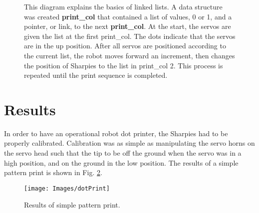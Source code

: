 \documentclass[11pt, oneside]{article}
\begin{document}
\begin{figure}[H]
    \centering
    \caption{This diagram explains the basics of linked lists. A data structure was created \textbf{print\_col} that contained a list of values, 0 or 1, and a pointer, or link, to the next \textbf{print\_col}. At the start, the servos are given the list at the first print\_col. The dots indicate that the servos are in the up position. After all servos are positioned according to the current list, the robot moves forward an increment, then changes the position of Sharpies to the list in print\_col 2. This process is repeated until the print sequence is completed.}
    \label{fig:linkedList}
\end{figure}

\section{Results}
In order to have an operational robot dot printer, the Sharpies had to be properly calibrated. Calibration was as simple as manipulating the servo horns on the servo head such that the tip to be off the ground when the servo was in a high position, and on the ground in the low position. The results of a simple pattern print is shown in Fig. \ref{fig:dotPrint}.


\begin{figure}[H]
    \centering
    \texttt{[image: Images/dotPrint]}
    \caption{Results of simple pattern print.}
    \label{fig:dotPrint}
\end{figure}
\end{document}
